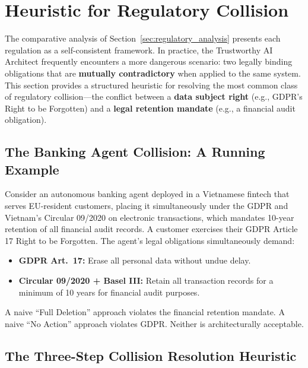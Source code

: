 \section{Heuristic for Regulatory Collision}
\label{sec:regulatory_collision}

The comparative analysis of Section~\ref{sec:regulatory_analysis} presents each regulation as a self-consistent framework. In practice, the Trustworthy AI Architect frequently encounters a more dangerous scenario: two legally binding obligations that are \textbf{mutually contradictory} when applied to the same system. This section provides a structured heuristic for resolving the most common class of regulatory collision---the conflict between a \textbf{data subject right} (e.g., GDPR's Right to be Forgotten) and a \textbf{legal retention mandate} (e.g., a financial audit obligation).

\subsection{The Banking Agent Collision: A Running Example}
\label{sec:banking_collision}

Consider an autonomous banking agent deployed in a Vietnamese fintech that serves EU-resident customers, placing it simultaneously under the GDPR and Vietnam's Circular 09/2020 on electronic transactions, which mandates 10-year retention of all financial audit records. A customer exercises their GDPR Article 17 Right to be Forgotten. The agent's legal obligations simultaneously demand:

\begin{itemize}
  \item \textbf{GDPR Art.~17:} Erase all personal data without undue delay.
  \item \textbf{Circular 09/2020 + Basel III:} Retain all transaction records for a minimum of 10 years for financial audit purposes.
\end{itemize}

A naive ``Full Deletion'' approach violates the financial retention mandate. A naive ``No Action'' approach violates GDPR. Neither is architecturally acceptable.

\subsection{The Three-Step Collision Resolution Heuristic}
\label{sec:collision_heuristic}

